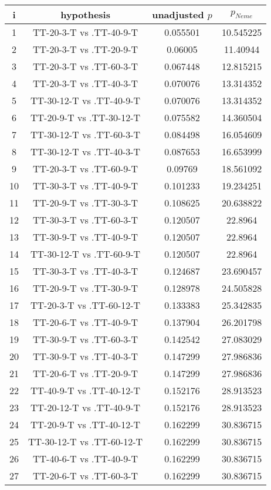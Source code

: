 \documentclass[a4paper,10pt]{article}
\begin{document}
\begin{landscape}
\begin{table}[!htp]
\centering\scriptsize
\begin{tabular}{cccc}
i&hypothesis&unadjusted $p$&$p_{Neme}$\\
\hline1&TT-20-3-T vs .TT-40-9-T&0.055501&10.545225\\
2&TT-20-3-T vs .TT-20-9-T&0.06005&11.40944\\
3&TT-20-3-T vs .TT-60-3-T&0.067448&12.815215\\
4&TT-20-3-T vs .TT-40-3-T&0.070076&13.314352\\
5&TT-30-12-T vs .TT-40-9-T&0.070076&13.314352\\
6&TT-20-9-T vs .TT-30-12-T&0.075582&14.360504\\
7&TT-30-12-T vs .TT-60-3-T&0.084498&16.054609\\
8&TT-30-12-T vs .TT-40-3-T&0.087653&16.653999\\
9&TT-20-3-T vs .TT-60-9-T&0.09769&18.561092\\
10&TT-30-3-T vs .TT-40-9-T&0.101233&19.234251\\
11&TT-20-9-T vs .TT-30-3-T&0.108625&20.638822\\
12&TT-30-3-T vs .TT-60-3-T&0.120507&22.8964\\
13&TT-30-9-T vs .TT-40-9-T&0.120507&22.8964\\
14&TT-30-12-T vs .TT-60-9-T&0.120507&22.8964\\
15&TT-30-3-T vs .TT-40-3-T&0.124687&23.690457\\
16&TT-20-9-T vs .TT-30-9-T&0.128978&24.505828\\
17&TT-20-3-T vs .TT-60-12-T&0.133383&25.342835\\
18&TT-20-6-T vs .TT-40-9-T&0.137904&26.201798\\
19&TT-30-9-T vs .TT-60-3-T&0.142542&27.083029\\
20&TT-30-9-T vs .TT-40-3-T&0.147299&27.986836\\
21&TT-20-6-T vs .TT-20-9-T&0.147299&27.986836\\
22&TT-40-9-T vs .TT-40-12-T&0.152176&28.913523\\
23&TT-20-12-T vs .TT-40-9-T&0.152176&28.913523\\
24&TT-20-9-T vs .TT-40-12-T&0.162299&30.836715\\
25&TT-30-12-T vs .TT-60-12-T&0.162299&30.836715\\
26&TT-40-6-T vs .TT-40-9-T&0.162299&30.836715\\
27&TT-20-6-T vs .TT-60-3-T&0.162299&30.836715\\

\end{tabular}
\end{table}
\end{landscape}
\end{document}
